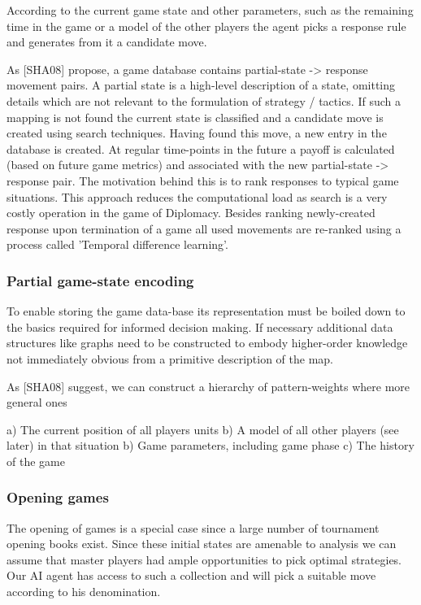 \documentclass[12pt]{article}
\begin{document}
According to the current game state and other parameters, such
as the remaining time in the game or a model of the other players
the agent picks a response rule and generates from it a candidate
move. 

As [SHA08] propose, a game database contains partial-state -> response movement
pairs. A partial state is a high-level description of a state, omitting
details which are not relevant to the formulation of strategy / tactics. If
such a mapping is not found the current state is classified and a candidate move
is created using search techniques. Having found this move, a new entry in the 
database is created. At regular time-points in the future a payoff is calculated
(based on future game metrics) and associated with the new partial-state -> response pair.
The motivation behind this is to rank responses to typical game situations. This
approach reduces the computational load as search is a very costly operation in the
game of Diplomacy. Besides ranking newly-created response upon termination of a game
all used movements are re-ranked using a process called 'Temporal difference learning'.

\subsubsection{Partial game-state encoding}

To enable storing the game data-base its representation must be boiled down to 
the basics required for informed decision making. If necessary additional data
structures like graphs need to be constructed to embody higher-order knowledge
not immediately obvious from a primitive description of the map. 

As [SHA08] suggest, we can construct a hierarchy of pattern-weights where more 
general ones 

a) The current position of all players units
b) A model of all other players (see later) in that situation 
b) Game parameters, including game phase
c) The history of the game


\subsubsection{Opening games}

The opening of games is a special case since a large number
of tournament opening books exist. Since these initial states are amenable to
analysis we can assume that master players had ample opportunities to
pick optimal strategies. Our AI agent has access to such a collection
and will pick a suitable move according to his denomination.
\end{document}
